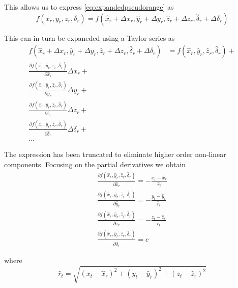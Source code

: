 This allows us to express \ref{eq:expandedpseudorange} as
\begin{equation}
    f(x_r, y_r, z_r, \delta_r) = f(\hat x_r + \Delta x_r, \hat y_r + \Delta y_r,
      \hat z_r + \Delta z_r, \hat \delta_r + \Delta \delta_r)
\end{equation}

This can in turn be expaneded using a Taylor series as
\begin{equation} \label{eq:taylorseries}
  \begin{aligned}
  f(\hat x_r + \Delta x_r, \hat y_r + \Delta y_r,
      \hat z_r + \Delta z_r, \hat \delta_r + \Delta \delta_r) &= f(\hat x_r, \hat y_r,
      \hat z_r, \hat \delta_r) + \\
      \frac{\partial f(\hat x_r, \hat y_r, \hat z_r, \hat \delta_r)}{\partial \hat x_r} \Delta x_r + \\
      \frac{\partial f(\hat x_r, \hat y_r, \hat z_r, \hat \delta_r)}{\partial \hat y_r} \Delta y_r + \\
      \frac{\partial f(\hat x_r, \hat y_r, \hat z_r, \hat \delta_r)}{\partial \hat z_r} \Delta z_r + \\
      \frac{\partial f(\hat x_r, \hat y_r, \hat z_r, \hat \delta_r)}{\partial \hat \delta_r} \Delta \delta_r + \\
      ...
  \end{aligned}
\end{equation}

The expression has been truncated to eliminate higher order non-linear
components. Focusing on the partial derivatives we obtain
\begin{equation} \label{eq:partialsexpansion}
  \begin{array}{l}
    \frac{\partial f(\hat x_r, \hat y_r, \hat z_r, \hat \delta_r)}{\partial \hat x_r} = - \frac{x_t - \hat x_r}{\hat r_t} \\
    \frac{\partial f(\hat x_r, \hat y_r, \hat z_r, \hat \delta_r)}{\partial \hat y_r} = - \frac{y_t - \hat y_r}{\hat r_t} \\
    \frac{\partial f(\hat x_r, \hat y_r, \hat z_r, \hat \delta_r)}{\partial \hat z_r} = - \frac{z_t - \hat z_r}{\hat r_t} \\
    \frac{\partial f(\hat x_r, \hat y_r, \hat z_r, \hat \delta_r)}{\partial \hat \delta_r} = c
  \end{array}
\end{equation}

where
\begin{equation}
  \hat r_t = \sqrt{(x_t - \hat x_r)^2 + (y_t - \hat y_r)^2 + (z_t - \hat z_r)^2}
\end{equation}

